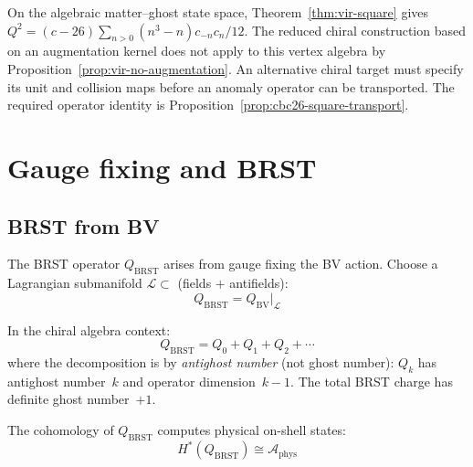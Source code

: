 \begin{remark}[Anomaly = curvature]\label{rem:anomaly-curvature-bv}
On the algebraic matter--ghost state space, Theorem~\ref{thm:vir-square} gives $Q^2=(c-26)\sum_{n>0}(n^3-n)c_{-n}c_n/12$.
The reduced chiral construction based on an augmentation kernel does not apply to this vertex algebra by Proposition~\ref{prop:vir-no-augmentation}.
An alternative chiral target must specify its unit and collision maps before an anomaly operator can be transported.
The required operator identity is Proposition~\ref{prop:cbc26-square-transport}.
\end{remark}

\section{Gauge fixing and BRST}

\subsection{BRST from BV}

\begin{definition}
The BRST operator $Q_{\text{BRST}}$ arises from gauge fixing the BV action. 
Choose a Lagrangian submanifold $\mathcal{L} \subset$ (fields + antifields):
\[Q_{\text{BRST}} = Q_{\text{BV}}|_{\mathcal{L}}\]

In the chiral algebra context:
\[Q_{\text{BRST}} = Q_0 + Q_1 + Q_2 + \cdots\]
where the decomposition is by \emph{antighost number} (not ghost number): $Q_k$ has antighost number~$k$ and operator dimension~$k-1$.  The total BRST charge has definite ghost number~$+1$.
\end{definition}

\begin{theorem}[BRST cohomology = physical states; \ClaimStatusProvedElsewhere{} \cite{CG17}]
\label{thm:brst-physical-states}
The cohomology of $Q_{\text{BRST}}$ computes physical on-shell states:
\[H^*(Q_{\text{BRST}}) \cong \mathcal{A}_{\text{phys}}\]
\end{theorem}

